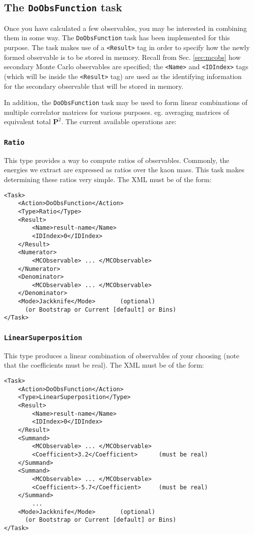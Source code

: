 \documentclass[12pt]{article}
\newcommand{\vb}{\texttt}
\begin{document}
\subsection{The \vb{DoObsFunction} task}

Once you have calculated a few observables, you may be interested in combining them in some way.
The \vb{DoObsFunction} task has been implemented for this purpose.
The task makes use of a \vb{<Result>} tag in order to specify how
the newly formed observable is to be stored in memory.
Recall from Sec. \ref{sec:mcobs}
how secondary Monte Carlo observables are specified; the \vb{<Name>}
and \vb{<IDIndex>} tags (which will be inside the \vb{<Result>} tag)
are used as the identifying information
for the secondary observable that will be stored in memory.

In addition, the \vb{DoObsFunction} task may be used to form linear combinations of multiple
correlator matrices for various purposes. eg. averaging matrices of equivalent total $\mathbf{P}^2$.
The current available operations are:

\subsubsection{\vb{Ratio}}
This type provides a way to compute ratios of observables. Commonly,
the energies we extract are expressed as ratios over the kaon mass. This task makes
determining these ratios very simple.
The XML must be of the form:
\begin{verbatim}
<Task>
    <Action>DoObsFunction</Action>
    <Type>Ratio</Type>
    <Result>
        <Name>result-name</Name>
        <IDIndex>0</IDIndex>
    </Result>
    <Numerator>
        <MCObservable> ... </MCObservable>
    </Numerator>
    <Denominator>
        <MCObservable> ... </MCObservable>
    </Denominator>
    <Mode>Jackknife</Mode>       (optional)
      (or Bootstrap or Current [default] or Bins)
</Task>
\end{verbatim}
\subsubsection{\vb{LinearSuperposition}}
This type produces a linear combination
of observables of your choosing (note that the coefficients must be real).
The XML must be of the form:
\begin{verbatim}
<Task>
    <Action>DoObsFunction</Action>
    <Type>LinearSuperposition</Type>
    <Result>
        <Name>result-name</Name>
        <IDIndex>0</IDIndex>
    </Result>
    <Summand>
        <MCObservable> ... </MCObservable>
        <Coefficient>3.2</Coefficient>      (must be real)
    </Summand>
    <Summand>
        <MCObservable> ... </MCObservable>
        <Coefficient>-5.7</Coefficient>     (must be real)
    </Summand>
        ...
    <Mode>Jackknife</Mode>       (optional)
      (or Bootstrap or Current [default] or Bins)
</Task>
\end{verbatim}
\end{document}
